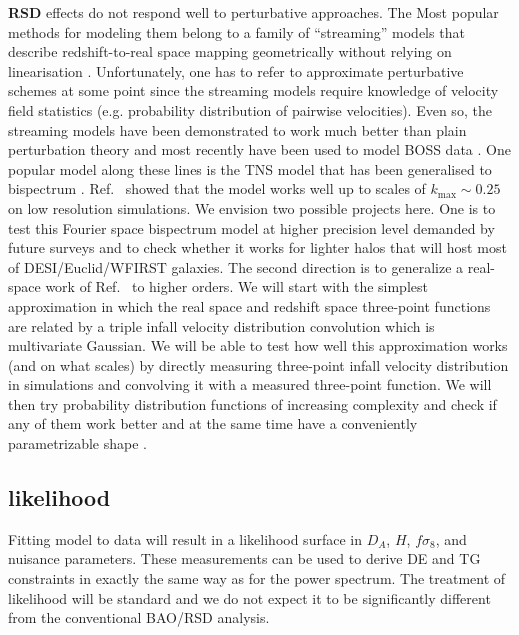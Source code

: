 \textbf{RSD} effects do not respond well to perturbative approaches. The Most
popular methods for modeling them belong to a family of ``streaming'' models
that describe redshift-to-real space mapping geometrically without relying on
linearisation
\cite{1995ApJ...448..494F,2018MNRAS.479.2256K,2016PhRvD..94l3522K,2016JCAP...12..007V,2015PhRvD..92f3004U}.
Unfortunately, one has to refer to approximate perturbative schemes at some
point since the streaming models require knowledge of velocity field statistics
(e.g. probability distribution of pairwise velocities). Even so, the streaming
models have been demonstrated to work much better than plain perturbation
theory and most recently have been used to model BOSS data
\cite{2012MNRAS.426.2719R}. One popular model along these lines is the TNS
model \cite{2010PhRvD..82f3522T} that has been generalised to bispectrum
\cite{2017PhRvD..96d3526H}. Ref.~\cite{2017PhRvD..96d3526H} showed that the
model works well up to scales of $k_\mathrm{max} \sim 0.25$ on low resolution
simulations. We envision two possible projects here. One is to test this
Fourier space bispectrum model at higher precision level demanded by future
surveys and to check whether it works for lighter halos that will host most of
DESI/Euclid/WFIRST galaxies. The second direction is to generalize a real-space
work of Ref.~\cite{2018MNRAS.479.2256K} to higher orders. We will start with
the simplest approximation in which the real space and redshift space
three-point functions are related by a triple infall velocity distribution
convolution which is multivariate Gaussian. We will be able to test how well
this approximation works (and on what scales) by directly
measuring three-point infall velocity distribution in simulations and
convolving it with a measured three-point function. We will then try
probability distribution functions of increasing complexity and check if any of
them work better and at the same time have a conveniently parametrizable shape
\cite{2016MNRAS.463.3783B}.

\subsection*{likelihood}

Fitting model to data will result in a likelihood surface in $D_A$, $H$,
$f\sigma_8$, and nuisance parameters. These measurements can be used to
derive DE and TG constraints in exactly the same way as for the power spectrum.
The treatment of likelihood will be standard and we do not expect it to be
significantly different from the conventional BAO/RSD analysis. 

